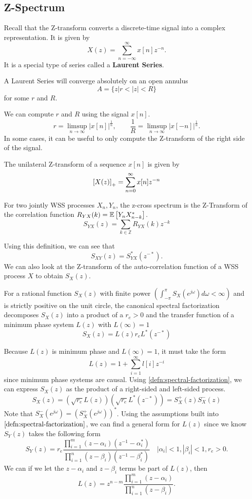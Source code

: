 \subsection{Z-Spectrum}
Recall that the Z-transform converts a discrete-time signal into a complex representation.
It is given by \[
	X(z) = \sum_{n=-\infty}^{\infty}x[n]z^{-n}.
\]
It is a special type of series called a \textbf{Laurent Series}.
\begin{theorem}
	A Laurent Series will converge absolutely on an open annulus \[
		A = \{z | r < |z| < R \}
	\] for some $r$ and $R$.
	\label{thm:z-transform-roc}
\end{theorem}
We can compute $r$ and $R$ using the signal $x[n]$.
\[
	r = \limsup_{n\to\infty} |x[n]|^{\frac{1}{n}}, \qquad \frac{1}{R} = \limsup_{n\to\infty}|x[-n]|^{\frac{1}{n}}.
\]
In some cases, it can be useful to only compute the Z-transform of the right side of the signal.
\begin{definition}
	The unilateral Z-transform of a sequence $x[n]$ is given by \[
		\left[X(z)\right]_+ = \sum_{n=0}^\infty x[n]z^{-n}
	\]
	\label{defn:unilateral-z-transform}
\end{definition}
\begin{definition}
	For two jointly WSS processes $X_n, Y_n$, the z-cross spectrum is the Z-Transform of the correlation function $R_{YX}(k) = \mathbb{E}\left[Y_nX^*_{n-k}\right]$.
	\[
		S_{YX}(z) = \sum_{k\in\mathbb{Z}}R_{YX}(k)z^{-k}
	\]
	\label{defn:z-cross-spectrum}
\end{definition}
Using this definition, we can see that \[
	S_{XY}(z) = S^*_{YX}(z^{-*}).
\]
We can also look at the Z-transform of the auto-correlation function of a WSS process $X$ to obtain $S_X(z)$.
\begin{definition}
	For a rational function $S_X(z)$ with finite power $\left(\int_{-\pi}^\pi S_X(e^{j\omega})d\omega < \infty \right)$ and is strictly positive on the unit circle, the canonical spectral factorization decomposes $S_X(z)$ into a product of a $r_e>0$ and the transfer function of a minimum phase system $L(z)$ with $L(\infty) = 1$ \[
		S_X(z) = L(z)r_eL^*(z^{-*})
	\]
	\label{defn:spectral-factorization}
\end{definition}
Because $L(z)$ is minimum phase and $L(\infty)=1$, it must take the form \[
	L(z) = 1 + \sum_{i=1}^\infty l[i]z^{-i}
\] since minimum phase systems are causal.
Using \cref{defn:spectral-factorization}, we can express $S_X(z)$ as the product of a right-sided and left-sided process.
\[
	S_X(z) = (\sqrt{r_e}L(z))(\sqrt{r_e}L^*(z^{-*})) = S_X^+(z)S_X^-(z)
\]
Note that $S_X^-(e^{j\omega}) = \left(S_X^+(e^{j\omega})\right)^*$.
Using the assumptions built into $\cref{defn:spectral-factorization}$, we can find a general form for $L(z)$ since we know $S_Y(z)$ takes the following form
\[
	S_Y(z) = r_e \frac{\prod_{i=1}^m(z-\alpha_i)(z^{-1}-\alpha_i^*)}{\prod_{i=1}^n(z-\beta_i)(z^{-1}-\beta_i^*)}\quad |\alpha_i| < 1, |\beta_i| < 1, r_e > 0.
\]
We can if we let the $z - \alpha_i$ and $z-\beta_i$ terms be part of $L(z)$, then
\[
	L(z) = z^{n-m}\frac{\prod_{i=1}^m(z-\alpha_i)}{\prod_{i=1}^n(z-\beta_i)}.
\]
